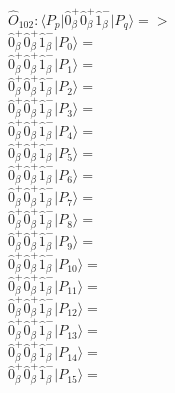 \documentclass[14pt]{article}
\begin{document}
    $\hat{O}_{102}:  \langle{P_p}\vert \hat{0}_{\beta}^{+}\hat{0}_{\beta}^{+}\hat{1}_{\beta}^{-} \vert{P_q}\rangle => $ \\ 
    $ \hat{0}_{\beta}^{+}\hat{0}_{\beta}^{+}\hat{1}_{\beta}^{-} \vert{P_{0}}\rangle =  $ \\ 
    $ \hat{0}_{\beta}^{+}\hat{0}_{\beta}^{+}\hat{1}_{\beta}^{-} \vert{P_{1}}\rangle =  $ \\ 
    $ \hat{0}_{\beta}^{+}\hat{0}_{\beta}^{+}\hat{1}_{\beta}^{-} \vert{P_{2}}\rangle =  $ \\ 
    $ \hat{0}_{\beta}^{+}\hat{0}_{\beta}^{+}\hat{1}_{\beta}^{-} \vert{P_{3}}\rangle =  $ \\ 
    $ \hat{0}_{\beta}^{+}\hat{0}_{\beta}^{+}\hat{1}_{\beta}^{-} \vert{P_{4}}\rangle =  $ \\ 
    $ \hat{0}_{\beta}^{+}\hat{0}_{\beta}^{+}\hat{1}_{\beta}^{-} \vert{P_{5}}\rangle =  $ \\ 
    $ \hat{0}_{\beta}^{+}\hat{0}_{\beta}^{+}\hat{1}_{\beta}^{-} \vert{P_{6}}\rangle =  $ \\ 
    $ \hat{0}_{\beta}^{+}\hat{0}_{\beta}^{+}\hat{1}_{\beta}^{-} \vert{P_{7}}\rangle =  $ \\ 
    $ \hat{0}_{\beta}^{+}\hat{0}_{\beta}^{+}\hat{1}_{\beta}^{-} \vert{P_{8}}\rangle =  $ \\ 
    $ \hat{0}_{\beta}^{+}\hat{0}_{\beta}^{+}\hat{1}_{\beta}^{-} \vert{P_{9}}\rangle =  $ \\ 
    $ \hat{0}_{\beta}^{+}\hat{0}_{\beta}^{+}\hat{1}_{\beta}^{-} \vert{P_{10}}\rangle =  $ \\ 
    $ \hat{0}_{\beta}^{+}\hat{0}_{\beta}^{+}\hat{1}_{\beta}^{-} \vert{P_{11}}\rangle =  $ \\ 
    $ \hat{0}_{\beta}^{+}\hat{0}_{\beta}^{+}\hat{1}_{\beta}^{-} \vert{P_{12}}\rangle =  $ \\ 
    $ \hat{0}_{\beta}^{+}\hat{0}_{\beta}^{+}\hat{1}_{\beta}^{-} \vert{P_{13}}\rangle =  $ \\ 
    $ \hat{0}_{\beta}^{+}\hat{0}_{\beta}^{+}\hat{1}_{\beta}^{-} \vert{P_{14}}\rangle =  $ \\ 
    $ \hat{0}_{\beta}^{+}\hat{0}_{\beta}^{+}\hat{1}_{\beta}^{-} \vert{P_{15}}\rangle =  $ \\ 
    
\end{document}
